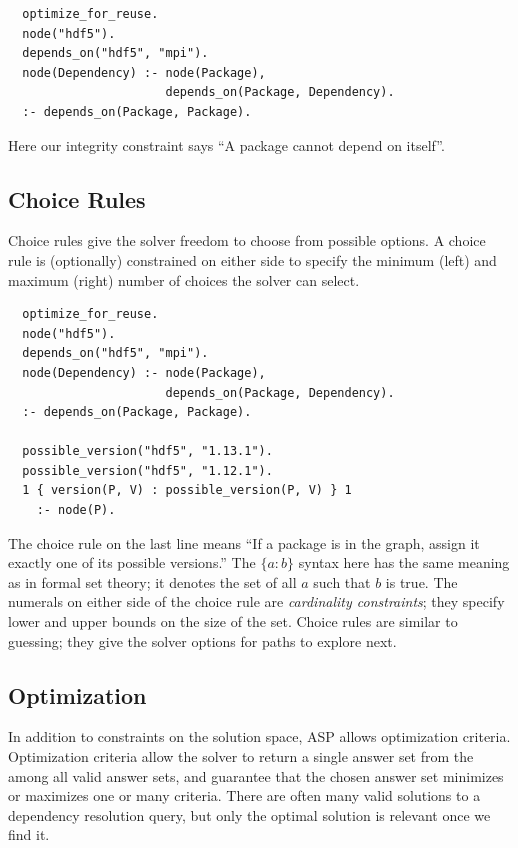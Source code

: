 \begin{verbatim}
  optimize_for_reuse.
  node("hdf5").
  depends_on("hdf5", "mpi").
  node(Dependency) :- node(Package),
                      depends_on(Package, Dependency).
  :- depends_on(Package, Package).
\end{verbatim}

Here our integrity constraint says ``A package cannot depend on itself''.

\subsection{Choice Rules}

Choice rules give the solver freedom to choose from possible options. A choice rule is
(optionally) constrained on either side to specify the minimum (left) and maximum
(right) number of choices the solver can select.

\begin{verbatim}
  optimize_for_reuse.
  node("hdf5").
  depends_on("hdf5", "mpi").
  node(Dependency) :- node(Package),
                      depends_on(Package, Dependency).
  :- depends_on(Package, Package).

  possible_version("hdf5", "1.13.1").
  possible_version("hdf5", "1.12.1").
  1 { version(P, V) : possible_version(P, V) } 1
    :- node(P).
\end{verbatim}

The choice rule on the last line means ``If a package is in the graph, assign it
exactly one of its possible versions.'' The $\{a:b\}$ syntax here has the same meaning
as in formal set theory; it denotes the set of all $a$ such that $b$ is true. The
numerals on either side of the choice rule are {\it cardinality constraints}; they specify
lower and upper bounds on the size of the set. Choice rules are similar to guessing;
they give the solver options for paths to explore next.


\subsection{Optimization}

In addition to constraints on the solution space, ASP allows optimization criteria.
Optimization criteria allow the solver to return a single answer set from the among all
valid answer sets, and guarantee that the chosen answer set minimizes or maximizes one
or many criteria. There are often many valid solutions to a dependency resolution query,
but only the optimal solution is relevant once we find it.

